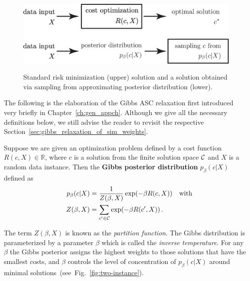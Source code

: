 \begin{figure}[htbp]
  \centering
  \noindent\includegraphics[width=.9\linewidth]{figures/ch_free_energy/posterior-distribution-explanation}
  \\[.5cm]
  \caption{Standard risk minimization (upper) solution and a solution obtained
  via sampling from approximating posterior distribution (lower).}
  \label{fig:posterior-explanation}
\end{figure}

\myremark The following is the elaboration of the Gibbs ASC relaxation first
introduced very briefly in Chapter~\ref{ch:gen_appch}. Although we give all the
necessary definitions below, we still advise the reader to revisit the
respective Section~\ref{sec:gibbs_relaxation_of_sim_weights}.

\begin{definition}
  Suppose we are given an optimization problem defined by a cost
  function $R(c,X) \in \mathbb{R}$, where $c$ is a solution from the
  finite solution space ${\cal C}$ and $X$ is a random data instance.  Then
  the \textbf{Gibbs posterior distribution} $p_\beta(c | X)$ defined
  as 
  \begin{align}\label{eq:GibbsDistr}
    p_\beta(c|X) &=\frac{1}{Z(\beta, X)} \exp(-\beta R(c, X))
      \quad\text{with} \notag \\
    \quad Z(\beta, X) &= \sum_{c^\prime\in {\cal C}} \exp(-\beta R(c^\prime, X))\,.
  \end{align}
\end{definition}
%
%
%
The term $Z(\beta, X)$ is known as the \textit{partition function}. The Gibbs
distribution is parameterized by a parameter $\beta$  which is called
the \textit{inverse temperature}. For any $\beta$ the Gibbs posterior assigns the highest
weights to those solutions that have the smallest costs, and $\beta$
controls the level of concentration of $p_\beta(c | X)$ around minimal
solutions~(see~Fig.~\ref{fig:two-instance}).

